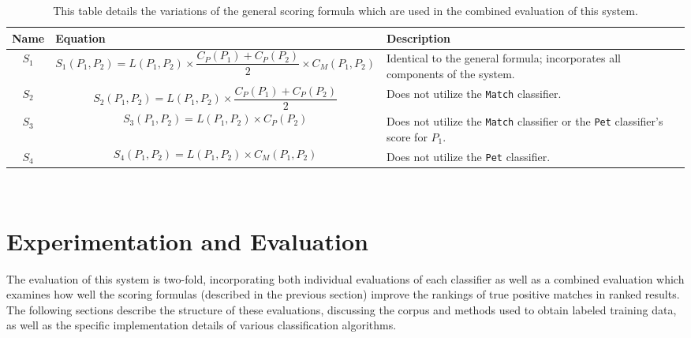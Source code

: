 \begin{table}[htb]
    \caption[Variations of the scoring formula]{
	This table details the variations of the general scoring formula which are used in the combined evaluation of this system.
	}
		\small
    \begin{center}
    \begin{tabularx}{ \textwidth}{| c | p{10cm} | X | } 
    \hline
    	Name & Equation & Description \\  \hline \hline
			
			$S_1$ & 
			\[ S_1(P_1, P_2) = L(P_1, P_2) \times \frac{C_P(P_1) + C_P(P_2)}{2} \times C_M(P_1, P_2) \] &
			Identical to the general formula; incorporates all components of the system.	\\ \hline
			
			$S_2$ & 
			\[ S_2(P_1, P_2) = L(P_1, P_2) \times \frac{C_P(P_1) + C_P(P_2)}{2} \] &
			Does not utilize the {\tt Match} classifier.	\\ \hline
			
			$S_3$ & 
			\[ S_3(P_1, P_2) = L(P_1, P_2) \times C_P(P_2) \] &
			Does not utilize the {\tt Match} classifier or the {\tt Pet} classifier's score for $P_1$.	\\ \hline
			
			$S_4$ & 
			\[ S_4(P_1, P_2) = L(P_1, P_2) \times C_M(P_1, P_2) \] &
			Does not utilize the {\tt Pet} classifier.	\\ \hline
	\end{tabularx}
   \\ \rule{0mm}{5mm}
	\end{center}
	 \label{table:scoring}
\end{table}


\section {Experimentation and Evaluation}

The evaluation of this system is two-fold, incorporating both individual evaluations of each classifier as well as a combined evaluation which examines how well the scoring formulas (described in the previous section) improve the rankings of true positive matches in ranked results.  The following sections describe the structure of these evaluations, discussing the corpus and methods used to obtain labeled training data, as well as the specific implementation details of various classification algorithms.

